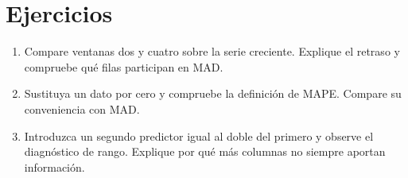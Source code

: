 \section{Ejercicios}
\begin{enumerate}
\item Compare ventanas dos y cuatro sobre la serie creciente. Explique el
retraso y compruebe qué filas participan en MAD.
\item Sustituya un dato por cero y compruebe la definición de MAPE. Compare
su conveniencia con MAD.
\item Introduzca un segundo predictor igual al doble del primero y observe el
diagnóstico de rango. Explique por qué más columnas no siempre aportan información.
\end{enumerate}
